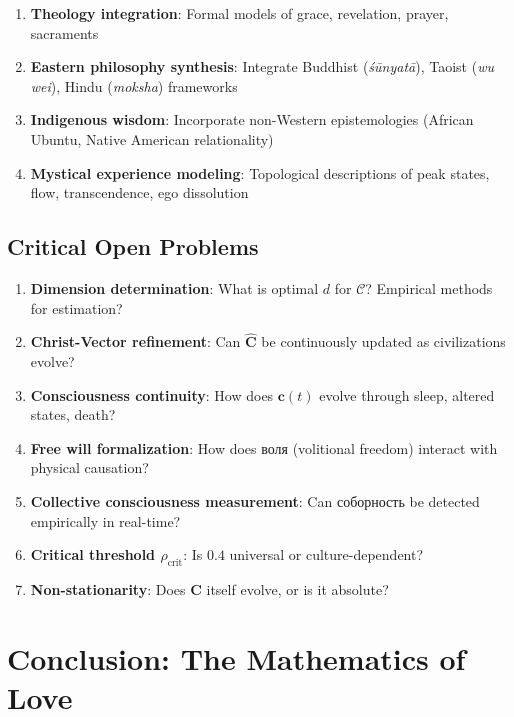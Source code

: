 \documentclass[11pt,a4paper]{article}
\theoremstyle{definition}
\theoremstyle{remark}
\newcommand{\CC}{\mathcal{C}}
\newcommand{\cc}{\mathbf{c}}
\begin{document}
\begin{enumerate}
\item \textbf{Theology integration}: Formal models of grace, revelation, prayer, sacraments

\item \textbf{Eastern philosophy synthesis}: Integrate Buddhist (\textit{śūnyatā}), Taoist (\textit{wu wei}), Hindu (\textit{moksha}) frameworks

\item \textbf{Indigenous wisdom}: Incorporate non-Western epistemologies (African Ubuntu, Native American relationality)

\item \textbf{Mystical experience modeling}: Topological descriptions of peak states, flow, transcendence, ego dissolution
\end{enumerate}

\subsection{Critical Open Problems}

\begin{enumerate}
\item \textbf{Dimension determination}: What is optimal \(d\) for \(\CC\)? Empirical methods for estimation?

\item \textbf{Christ-Vector refinement}: Can \(\hat{\mathbf{C}}\) be continuously updated as civilizations evolve?

\item \textbf{Consciousness continuity}: How does \(\cc(t)\) evolve through sleep, altered states, death?

\item \textbf{Free will formalization}: How does воля (volitional freedom) interact with physical causation?

\item \textbf{Collective consciousness measurement}: Can соборность be detected empirically in real-time?

\item \textbf{Critical threshold \(\rho_{\text{crit}}\)}: Is \(0.4\) universal or culture-dependent?

\item \textbf{Non-stationarity}: Does \(\mathbf{C}\) itself evolve, or is it absolute?
\end{enumerate}

\section{Conclusion: The Mathematics of Love}
\end{document}
